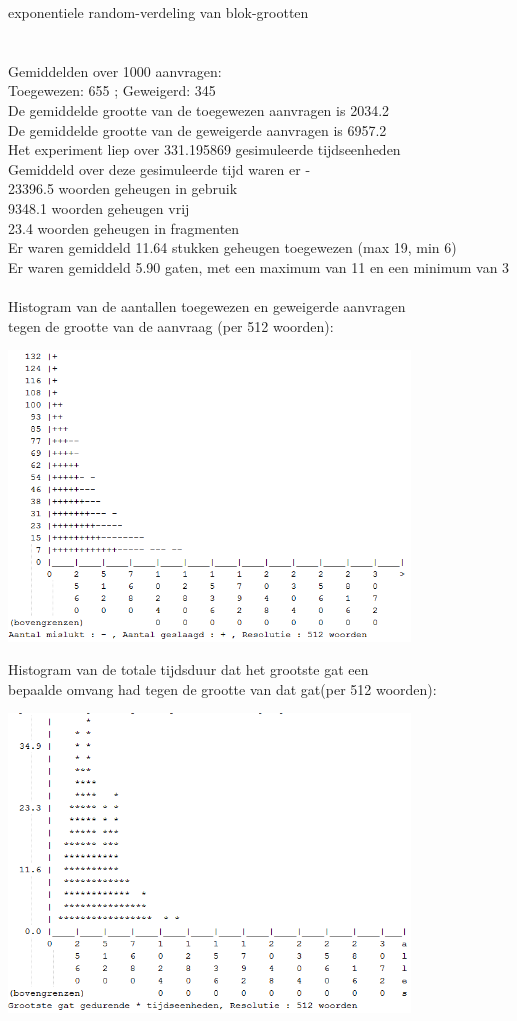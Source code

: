 \documentclass[a4paper]{article}
\begin{document}
exponentiele random-verdeling van blok-grootten\\
\\
\\
Gemiddelden over 1000 aanvragen:\\
Toegewezen: 655 ; Geweigerd: 345\\
De gemiddelde grootte van de toegewezen aanvragen is 2034.2\\
De gemiddelde grootte van de geweigerde aanvragen is 6957.2\\
Het experiment liep over 331.195869 gesimuleerde tijdseenheden\\
Gemiddeld over deze gesimuleerde tijd waren er - \\
 23396.5 woorden geheugen in gebruik\\
  9348.1 woorden geheugen vrij\\
    23.4 woorden geheugen in fragmenten\\
Er waren gemiddeld    11.64 stukken geheugen toegewezen (max 19, min 6)\\
Er waren gemiddeld     5.90 gaten, met een maximum van 11 en een minimum van 3\\
\\
Histogram van de aantallen toegewezen en geweigerde aanvragen\\
tegen de grootte van de aanvraag (per 512 woorden):
\begin{center}
\includegraphics[width=0.8\textwidth]{ff3.png}
\end{center}
Histogram van de totale tijdsduur dat het grootste gat een\\
bepaalde omvang had tegen de grootte van dat gat(per 512 woorden):
\begin{center}
\includegraphics[width=0.8\textwidth]{ff4.png}
\end{center}
\end{document}
